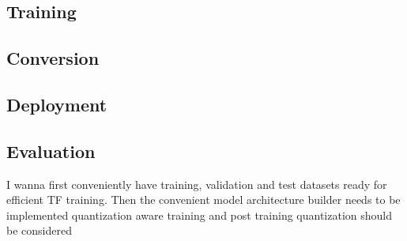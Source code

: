 {\subsection{Training}
\subsection{Conversion}
\subsection{Deployment}
\subsection{Evaluation}
I wanna first conveniently have training, validation and test datasets ready for efficient TF training.
Then the convenient model architecture builder needs to be implemented
quantization aware training and post training quantization should be considered

}